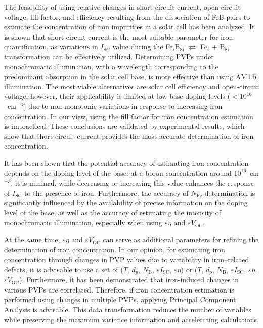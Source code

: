 \documentclass[a4paper,fleqn]{cas-sc}
\begin{document}
The feasibility of using relative changes in short-circuit current, open-circuit voltage,
fill factor, and efficiency resulting from the dissociation of FeB pairs
to estimate the concentration of iron impurities in a solar cell has been analyzed.
It is shown that short-circuit current is the most suitable parameter for iron quantification, as variations in $I_\mathrm{SC}$ value during the
Fe$_i$B$_\mathrm{Si}$ $\rightleftarrows$ Fe$_i$ + B$_\mathrm{Si}$ transformation can be effectively utilized.
Determining PVPs under monochromatic illumination,
with a wavelength corresponding to the predominant absorption in the solar cell base, is more effective than using AM1.5 illumination.
The most viable alternatives are solar cell efficiency and open-circuit voltage;
however, their applicability is limited at low base doping levels ($<10^{16}$~cm$^{-3}$)
due to non-monotonic variations in response to increasing iron concentration.
In our view, using the fill factor for iron concentration estimation is impractical.
These conclusions are validated by experimental results, which show that short-circuit current provides the most accurate determination of iron concentration.

It has been shown that the potential accuracy of estimating iron concentration depends
on the doping level of the base:
at a boron concentration around $10^{16}$~cm$^{-3}$, it is minimal,
while decreasing or increasing this value enhances the response of $I_\mathrm{SC}$ to the presence of iron.
Furthermore, the accuracy of $N_\mathrm{Fe}$ determination is significantly influenced by the availability
of precise information on the doping level of the base,
as well as the accuracy of estimating the intensity of monochromatic illumination,
especially when using $\varepsilon \eta$ and $\varepsilon V_\mathrm{OC}$.

At the same time, $\varepsilon \eta$ and $\varepsilon V_\mathrm{OC}$ can serve as additional parameters
for refining the determination of iron concentration.
In our opinion, for estimating iron concentration through changes
in PVP values due to variability in iron--related defects, it is advisable to use a set of
($T$, $d_p$, $N_\mathrm{B}$, $\varepsilon I_\mathrm{SC}$, $\varepsilon \eta$) or ($T$, $d_p$, $N_\mathrm{B}$, $\varepsilon I_\mathrm{SC}$, $\varepsilon \eta$,$\varepsilon V_\mathrm{OC}$).
Furthermore, it has been demonstrated that iron-induced changes in various PVPs are correlated.
Therefore, if iron concentration estimation is performed using changes
in multiple PVPs, applying Principal Component Analysis is advisable.
This data transformation reduces the number of variables while preserving the maximum variance information and accelerating calculations.
\end{document}
